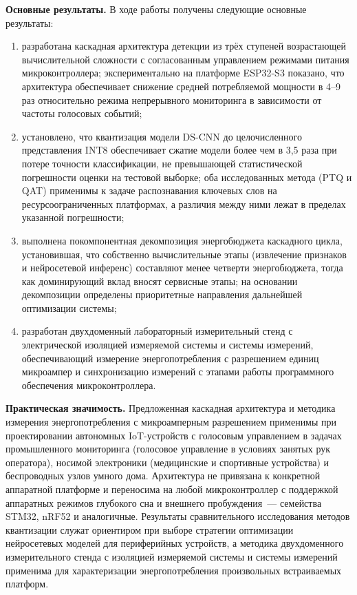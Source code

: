 \textbf{Основные результаты.} В ходе работы получены следующие основные
результаты:

\begin{enumerate}
	\item разработана каскадная архитектура детекции из трёх ступеней
	      возрастающей вычислительной сложности с согласованным
	      управлением режимами питания микроконтроллера; экспериментально
	      на платформе ESP32-S3 показано, что архитектура обеспечивает
	      снижение средней потребляемой мощности в 4--9 раз относительно
	      режима непрерывного мониторинга в зависимости от частоты
	      голосовых событий;
	\item установлено, что квантизация модели DS-CNN до целочисленного
	      представления INT8 обеспечивает сжатие модели более чем в 3,5
	      раза при потере точности классификации, не превышающей
	      статистической погрешности оценки на тестовой выборке; оба
	      исследованных метода (PTQ и QAT) применимы к задаче
	      распознавания ключевых слов на ресурсоограниченных платформах,
	      а различия между ними лежат в пределах указанной погрешности;
	\item выполнена покомпонентная декомпозиция энергобюджета каскадного
	      цикла, установившая, что собственно вычислительные этапы
	      (извлечение признаков и нейросетевой инференс) составляют менее
	      четверти энергобюджета, тогда как доминирующий вклад вносят
	      сервисные этапы; на основании декомпозиции определены
	      приоритетные направления дальнейшей оптимизации системы;
	\item разработан двухдоменный лабораторный измерительный стенд с
	      электрической изоляцией измеряемой системы и системы измерений,
	      обеспечивающий измерение энергопотребления с разрешением единиц
	      микроампер и синхронизацию измерений с этапами работы
	      программного обеспечения микроконтроллера.
\end{enumerate}

\textbf{Практическая значимость.} Предложенная каскадная архитектура и
методика измерения энергопотребления с микроамперным разрешением
применимы при проектировании автономных IoT-устройств с голосовым
управлением в задачах промышленного мониторинга (голосовое управление в
условиях занятых рук оператора), носимой электроники (медицинские и
спортивные устройства) и беспроводных узлов умного дома. Архитектура не
привязана к конкретной аппаратной платформе и переносима на любой
микроконтроллер с поддержкой аппаратных режимов глубокого сна и внешнего
пробуждения~--- семейства STM32, nRF52 и аналогичные. Результаты
сравнительного исследования методов квантизации служат ориентиром при
выборе стратегии оптимизации нейросетевых моделей для периферийных
устройств, а методика двухдоменного измерительного стенда с изоляцией
измеряемой системы и системы измерений применима для характеризации
энергопотребления произвольных встраиваемых платформ.

